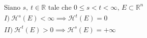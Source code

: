 \documentclass[preview]{standalone}
\begin{document}
\begin{align*}
\text{Siano } s,\ t \in  \mathbb{R} \text{ tale che } 0 \leq s < t < \infty, \, E \subset \mathbb{R}^n \\ I) \ \mathcal{H}^s(E) < \infty \implies \mathcal{H}^t(E) = 0 \\ II) \ \mathcal{H}^t(E) > 0 \implies \mathcal{H}^s(E) = + \infty
\end{align*}
\end{document}
